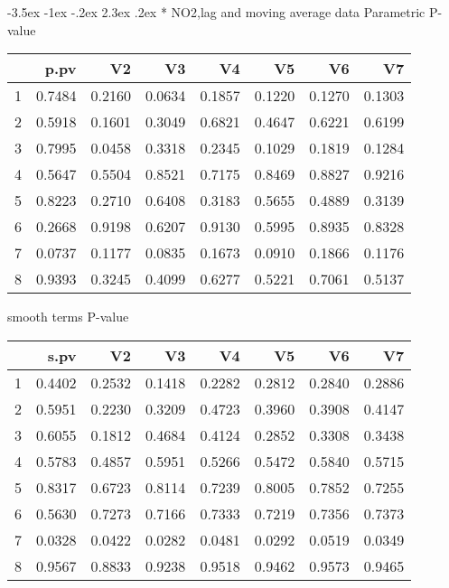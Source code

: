 \documentclass[a4paper, 12pt]{article}
\makeatletter
\def\Large{\fontsize{16}{24}\selectfont}
\renewcommand\section{\@startsection {section}{1}{\z@}%
                                   {-3.5ex \@plus -1ex \@minus -.2ex}%
                                   {2.3ex \@plus.2ex}%
                                   {\centering\normalfont\Large\bfseries}}
\makeatother
\begin{document}
\section*{ NO2,lag and moving average data}
Parametric P-value
\begin{table}[ht]
\centering
\begin{tabular}{rrrrrrrr}
  \hline
 & p.pv & V2 & V3 & V4 & V5 & V6 & V7 \\
  \hline
1 & 0.7484 & 0.2160 & 0.0634 & 0.1857 & 0.1220 & 0.1270 & 0.1303 \\
  2 & 0.5918 & 0.1601 & 0.3049 & 0.6821 & 0.4647 & 0.6221 & 0.6199 \\
  3 & 0.7995 & 0.0458 & 0.3318 & 0.2345 & 0.1029 & 0.1819 & 0.1284 \\
  4 & 0.5647 & 0.5504 & 0.8521 & 0.7175 & 0.8469 & 0.8827 & 0.9216 \\
  5 & 0.8223 & 0.2710 & 0.6408 & 0.3183 & 0.5655 & 0.4889 & 0.3139 \\
  6 & 0.2668 & 0.9198 & 0.6207 & 0.9130 & 0.5995 & 0.8935 & 0.8328 \\
  7 & 0.0737 & 0.1177 & 0.0835 & 0.1673 & 0.0910 & 0.1866 & 0.1176 \\
  8 & 0.9393 & 0.3245 & 0.4099 & 0.6277 & 0.5221 & 0.7061 & 0.5137 \\
   \hline
\end{tabular}
\end{table}

smooth terms P-value
\begin{table}[ht]
\centering
\begin{tabular}{rrrrrrrr}
  \hline
 & s.pv & V2 & V3 & V4 & V5 & V6 & V7 \\
  \hline
1 & 0.4402 & 0.2532 & 0.1418 & 0.2282 & 0.2812 & 0.2840 & 0.2886 \\
  2 & 0.5951 & 0.2230 & 0.3209 & 0.4723 & 0.3960 & 0.3908 & 0.4147 \\
  3 & 0.6055 & 0.1812 & 0.4684 & 0.4124 & 0.2852 & 0.3308 & 0.3438 \\
  4 & 0.5783 & 0.4857 & 0.5951 & 0.5266 & 0.5472 & 0.5840 & 0.5715 \\
  5 & 0.8317 & 0.6723 & 0.8114 & 0.7239 & 0.8005 & 0.7852 & 0.7255 \\
  6 & 0.5630 & 0.7273 & 0.7166 & 0.7333 & 0.7219 & 0.7356 & 0.7373 \\
  7 & 0.0328 & 0.0422 & 0.0282 & 0.0481 & 0.0292 & 0.0519 & 0.0349 \\
  8 & 0.9567 & 0.8833 & 0.9238 & 0.9518 & 0.9462 & 0.9573 & 0.9465 \\
   \hline
\end{tabular}
\end{table}
\clearpage
\end{document}
